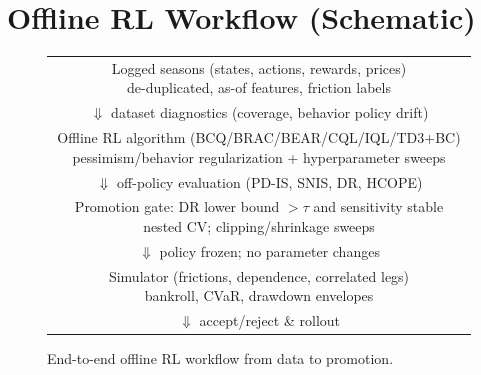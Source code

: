 \section{Offline RL Workflow (Schematic)}
\begin{figure}[t]
  \centering
  \setlength{\tabcolsep}{8pt}
  \renewcommand{\arraystretch}{1.2}
  \begin{tabular}{c}
    \fbox{\parbox{0.88\linewidth}{\centering Logged seasons (states, actions, rewards, prices) \\ \scriptsize de-duplicated, as-of features, friction labels}} \\[4pt]
    $\Downarrow$ \scriptsize dataset diagnostics (coverage, behavior policy drift) \\[4pt]
    \fbox{\parbox{0.88\linewidth}{\centering Offline RL algorithm (BCQ/BRAC/BEAR/CQL/IQL/TD3+BC) \\ \scriptsize pessimism/behavior regularization + hyperparameter sweeps}} \\[4pt]
    $\Downarrow$ \scriptsize off-policy evaluation (PD-IS, SNIS, DR, HCOPE) \\[4pt]
    \fbox{\parbox{0.88\linewidth}{\centering Promotion gate: DR lower bound $>\tau$ and sensitivity stable \\ \scriptsize nested CV; clipping/shrinkage sweeps}} \\[4pt]
    $\Downarrow$ \scriptsize policy frozen; no parameter changes \\[4pt]
    \fbox{\parbox{0.88\linewidth}{\centering Simulator (frictions, dependence, correlated legs) \\ \scriptsize bankroll, CVaR, drawdown envelopes}} \\[4pt]
    $\Downarrow$ \scriptsize accept/reject \& rollout
  \end{tabular}
  \caption{End-to-end offline RL workflow from data to promotion.}
  \label{fig:rl-workflow}
\end{figure}

